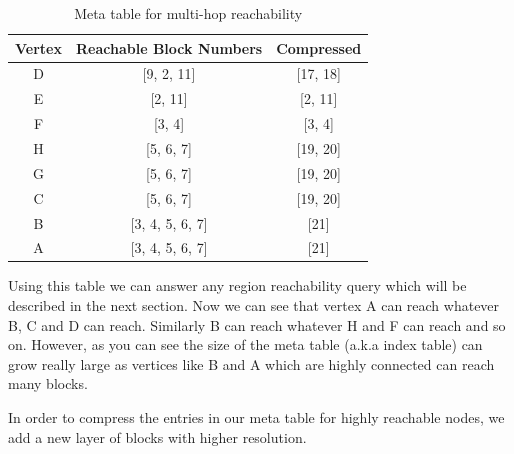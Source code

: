 \begin{table}[h]
	\caption{Meta table for multi-hop reachability}
	\label{tab:multi-hop-meta}
	\begin{center}
		\renewcommand{\arraystretch}{1.25}
		\begin{tabular}{ c | c | c }
			\hline
			Vertex & Reachable Block Numbers & Compressed\\ \hline
			\hline
			D & [9, 2, 11] & [17, 18] \\
			E & [2, 11] & [2, 11] \\
			F & [3, 4] & [3, 4] \\
			H & [5, 6, 7] & [19, 20] \\
			G & [5, 6, 7] & [19, 20] \\
			C & [5, 6, 7] & [19, 20] \\
			B & [3, 4, 5, 6, 7] & [21] \\
			A & [3, 4, 5, 6, 7] & [21] \\
			\hline
		\end{tabular}
	\end{center}
\end{table}

Using this table we can answer any region reachability query which will be described in the next section. Now we can see that vertex A can reach whatever B, C and D can reach. Similarly B can reach whatever H and F can reach and so on. However, as you can see the size of the meta table (a.k.a index table) can grow really large as vertices like B and A which are highly connected can reach many blocks.

In order to compress the entries in our meta table for highly reachable nodes, we add a new layer of blocks with higher resolution.


